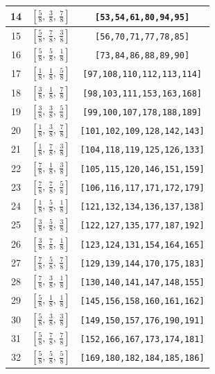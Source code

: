 \documentclass[fleqn,8pt]{jsarticle}
\begin{document}
\begin{longtable}{ccc}
14 & $\left[ \frac{5}{8},\, \frac{3}{8},\, \frac{7}{8} \right]$ & {\tt [53,54,61,80,94,95]} \\ \hline
15 & $\left[ \frac{5}{8},\, \frac{7}{8},\, \frac{3}{8} \right]$ & {\tt [56,70,71,77,78,85]} \\ \hline
16 & $\left[ \frac{5}{8},\, \frac{5}{8},\, \frac{1}{8} \right]$ & {\tt [73,84,86,88,89,90]} \\ \hline
17 & $\left[ \frac{1}{8},\, \frac{1}{8},\, \frac{5}{8} \right]$ & {\tt [97,108,110,112,113,114]} \\ \hline
18 & $\left[ \frac{3}{8},\, \frac{1}{8},\, \frac{7}{8} \right]$ & {\tt [98,103,111,153,163,168]} \\ \hline
19 & $\left[ \frac{3}{8},\, \frac{3}{8},\, \frac{5}{8} \right]$ & {\tt [99,100,107,178,188,189]} \\ \hline
20 & $\left[ \frac{1}{8},\, \frac{3}{8},\, \frac{7}{8} \right]$ & {\tt [101,102,109,128,142,143]} \\ \hline
21 & $\left[ \frac{1}{8},\, \frac{7}{8},\, \frac{3}{8} \right]$ & {\tt [104,118,119,125,126,133]} \\ \hline
22 & $\left[ \frac{7}{8},\, \frac{1}{8},\, \frac{3}{8} \right]$ & {\tt [105,115,120,146,151,159]} \\ \hline
23 & $\left[ \frac{7}{8},\, \frac{7}{8},\, \frac{5}{8} \right]$ & {\tt [106,116,117,171,172,179]} \\ \hline
24 & $\left[ \frac{1}{8},\, \frac{5}{8},\, \frac{1}{8} \right]$ & {\tt [121,132,134,136,137,138]} \\ \hline
25 & $\left[ \frac{3}{8},\, \frac{5}{8},\, \frac{3}{8} \right]$ & {\tt [122,127,135,177,187,192]} \\ \hline
26 & $\left[ \frac{3}{8},\, \frac{7}{8},\, \frac{1}{8} \right]$ & {\tt [123,124,131,154,164,165]} \\ \hline
27 & $\left[ \frac{7}{8},\, \frac{5}{8},\, \frac{7}{8} \right]$ & {\tt [129,139,144,170,175,183]} \\ \hline
28 & $\left[ \frac{7}{8},\, \frac{3}{8},\, \frac{1}{8} \right]$ & {\tt [130,140,141,147,148,155]} \\ \hline
29 & $\left[ \frac{5}{8},\, \frac{1}{8},\, \frac{1}{8} \right]$ & {\tt [145,156,158,160,161,162]} \\ \hline
30 & $\left[ \frac{5}{8},\, \frac{3}{8},\, \frac{3}{8} \right]$ & {\tt [149,150,157,176,190,191]} \\ \hline
31 & $\left[ \frac{5}{8},\, \frac{7}{8},\, \frac{7}{8} \right]$ & {\tt [152,166,167,173,174,181]} \\ \hline
32 & $\left[ \frac{5}{8},\, \frac{5}{8},\, \frac{5}{8} \right]$ & {\tt [169,180,182,184,185,186]} \\
\end{longtable}
\end{document}
